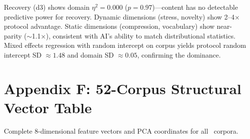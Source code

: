 \documentclass[11pt]{article}
\begin{document}
Recovery (d3) shows domain $\eta^2 = 0.000$ ($p = 0.97$)---content has no detectable predictive power for recovery. Dynamic dimensions (stress, novelty) show 2--4$\times$ protocol advantage. Static dimensions (compression, vocabulary) show near-parity ($\sim$1.1$\times$), consistent with AI's ability to match distributional statistics. Mixed effects regression with random intercept on corpus yields protocol random intercept SD $\approx 1.48$ and domain SD $\approx 0.05$, confirming the dominance.

\clearpage

\section{Appendix F: 52-Corpus Structural Vector Table}

Complete 8-dimensional feature vectors and PCA coordinates for all \nCorpora\ corpora.
\end{document}
